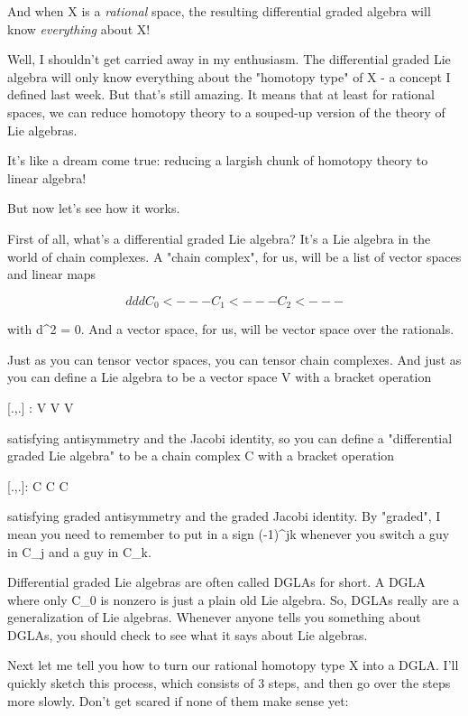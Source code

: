 And when X is a \emph{rational} space, the resulting differential graded
algebra will know \emph{everything} about X!

Well, I shouldn't get carried away in my enthusiasm.  The differential
graded Lie algebra will only know everything about the "homotopy
type" of X - a concept I defined last week.  But that's still
amazing.  It means that at least for rational spaces, we can reduce
homotopy theory to a souped-up version of the theory of Lie algebras.

It's like a dream come true: reducing a largish chunk of homotopy
theory to linear algebra!

But now let's see how it works.

First of all, what's a differential graded Lie algebra?  It's a 
Lie algebra in the world of chain complexes.   A "chain complex",
for us, will be a list of vector spaces and linear maps


$$

     d       d      d
C_{0} <--- C_{1} <--- C_{2} <---
$$
    

with d^{2} = 0.  And a vector space, for us, will be vector
space over the rationals.

Just as you can tensor vector spaces, you can tensor chain complexes.
And just as you can define a Lie algebra to be a vector space V with
a bracket operation

[.,.] : V \otimes  V \to  V

satisfying antisymmetry and the Jacobi identity, so you can define a
"differential graded Lie algebra" to be a chain complex C with a
bracket operation

[.,.]: C \otimes  C \to  C

satisfying graded antisymmetry and the graded Jacobi identity.  By
"graded", I mean you need to remember to put in a sign
(-1)^{jk} whenever you switch a guy in C_{j} and a guy in 
C_{k}.

Differential graded Lie algebras are often called DGLAs for short.  A
DGLA where only C_{0} is nonzero is just a plain old Lie
algebra.  So, DGLAs really are a generalization of Lie algebras.
Whenever anyone tells you something about DGLAs, you should check to
see what it says about Lie algebras.

Next let me tell you how to turn our rational homotopy type X into a
DGLA.  I'll quickly sketch this process, which consists of 3 steps,
and then go over the steps more slowly.  Don't get scared if none
of them make sense yet:

